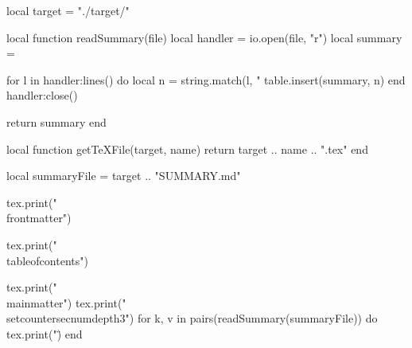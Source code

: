 \documentclass[10pt, a4, oneside]{ltjsbook}
\begin{document}
\begin{luacode*}
  local target = "./target/"

  local function readSummary(file)
    local handler = io.open(file, "r")
    local summary = {}

    for l in handler:lines() do
      local n = string.match(l, "%
      table.insert(summary, n)
    end
    handler:close()

    return summary
  end

  local function getTeXFile(target, name)
    return target .. name .. ".tex"
  end

  local summaryFile = target .. "SUMMARY.md"

  tex.print("\\frontmatter")

  tex.print("\\tableofcontents")

  tex.print("\\mainmatter")
  tex.print("\\setcounter{secnumdepth}{3}")
  for k, v in pairs(readSummary(summaryFile)) do
    tex.print("\")
  end
\end{luacode*}
\end{document}

